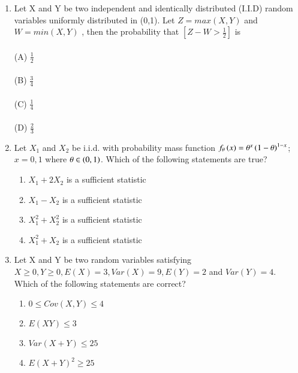 \begin{enumerate}[label=\thesection.\arabic*.,ref=\thesection.\theenumi]
\item Let X and Y be two independent and identically distributed (I.I.D) random variables uniformly distributed in (0,1). Let $Z = max(X,Y)$ and $W = min(X,Y)$ , then the probability that $[Z-W >\frac{1}{2}]$ is\\
\\(A) $\frac{1}{2}$\\
\\(B) $\frac{3}{4}$\\
\\(C) $\frac{1}{4}$\\
\\(D) $\frac{2}{3}$    
%
\solution

%
\item Let $X_1$ and $X_2$ be i.i.d. with probability mass function $f_{\theta}\left(x\right) = \theta^x \left(1-\theta\right)^{1-x}$; $x=0,1$ where $\theta \in \left(0,1\right)$. Which of the following statements are true?
\begin{enumerate}
    \item $X_1 + 2X_2 $ is a sufficient statistic
    \item $X_1 - X_2 $ is a sufficient statistic
    \item $X_1^2 + X_2^2 $ is a sufficient statistic
    \item $X_1^2 + X_2 $ is a sufficient statistic
\end{enumerate}
%
\solution

\item Let X and Y be two random variables satisfying $X\geq 0, Y \geq 0, E(X)=3, Var(X)=9, E(Y)=2$ and $Var(Y)=4$. Which of the following statements are correct?
\begin{enumerate}[label=\Alph*)]
    \item $0\leq Cov(X,Y)\leq 4$
    \item $E(XY)\leq 3$
    \item $Var(X+Y)\leq 25$
    \item $E(X+Y)^2\geq 25$
\end{enumerate}
%
\solution



\end{enumerate}
